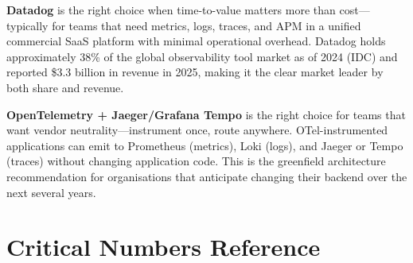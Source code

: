 \documentclass[11pt,a4paper]{article}
\begin{document}
\textbf{Datadog} is the right choice when time-to-value matters more than cost---typically for teams that need metrics, logs, traces, and APM in a unified commercial SaaS platform with minimal operational overhead. Datadog holds approximately 38\% of the global observability tool market as of 2024 (IDC) and reported \$3.3 billion in revenue in 2025, making it the clear market leader by both share and revenue.

\textbf{OpenTelemetry + Jaeger/Grafana Tempo} is the right choice for teams that want vendor neutrality---instrument once, route anywhere. OTel-instrumented applications can emit to Prometheus (metrics), Loki (logs), and Jaeger or Tempo (traces) without changing application code. This is the greenfield architecture recommendation for organisations that anticipate changing their backend over the next several years.

\section{Critical Numbers Reference}
\end{document}
